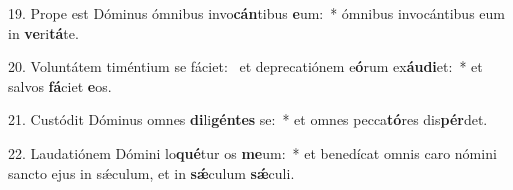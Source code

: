19. Prope est Dóminus ómnibus invo\textbf{cán}tibus \textbf{e}um:~*  ómnibus invocántibus eum in \textbf{ve}ri\textbf{tá}te.\

20. Voluntátem timéntium se fáciet: \dag\  et deprecatiónem e\textbf{ó}rum ex\textbf{áu}\textbf{di}et:~*  et salvos \textbf{fá}ciet \textbf{e}os.\

21. Custódit Dóminus omnes \textbf{di}li\textbf{gén}\textbf{tes} se:~*  et omnes pecca\textbf{tó}res dis\textbf{pér}det.\

22. Laudatiónem Dómini lo\textbf{qué}tur os \textbf{me}um:~*  et benedícat omnis caro nómini sancto ejus in sǽculum, et in \textbf{sǽ}culum \textbf{sǽ}culi.\

